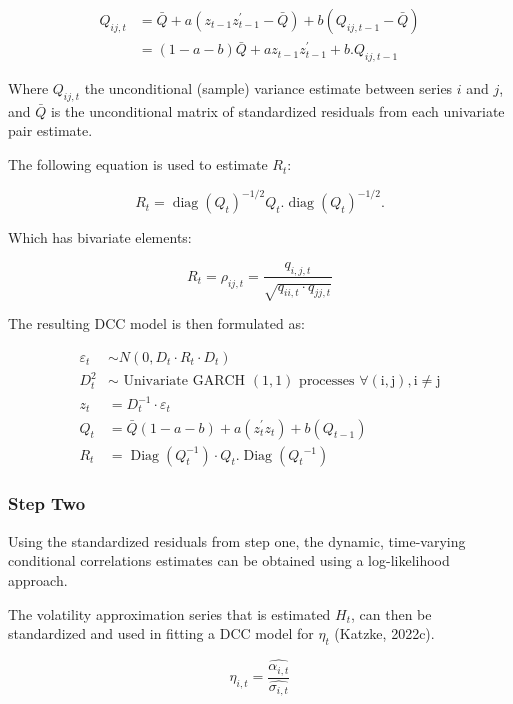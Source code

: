 \documentclass[11pt,preprint, authoryear]{elsarticle}
\numberwithin{equation}{section}
\numberwithin{figure}{section}
\numberwithin{table}{section}
\begin{document}
\[
\begin{aligned}
Q_{i j, t} & =\bar{Q}+a\left(z_{t-1} z_{t-1}^{\prime}-\bar{Q}\right)+b\left(Q_{i j, t-1}-\bar{Q}\right) \\
& =(1-a-b) \bar{Q}+a z_{t-1} z_{t-1}^{\prime}+b . Q_{i j, t-1}
\end{aligned}
\]

Where \(Q_{i j, t}\) the unconditional (sample) variance estimate
between series \(i\) and \(j\), and \(\bar{Q}\) is the unconditional
matrix of standardized residuals from each univariate pair estimate.

The following equation is used to estimate \(R_{t}\):

\[
R_{t}=\operatorname{diag}\left(Q_{t}\right)^{-1 / 2} Q_{t} . \operatorname{diag}\left(Q_{t}\right)^{-1 / 2} .
\]

Which has bivariate elements:

\[
R_{t}=\rho_{i j, t}=\frac{q_{i, j, t}}{\sqrt{q_{i i, t} \cdot q_{j j, t}}}
\]

The resulting DCC model is then formulated as:

\[
\begin{aligned}
\varepsilon_{t} & \sim N\left(0, D_{t} \cdot R_{t} \cdot D_{t}\right) \\
D_{t}^{2} & \sim \text { Univariate GARCH }(1,1) \text { processes } \forall(\mathrm{i}, \mathrm{j}), \mathrm{i} \neq \mathrm{j} \\
z_{t} & =D_{t}^{-1} \cdot \varepsilon_{t} \\
Q_{t} & =\bar{Q}(1-a-b)+a\left(z_{t}^{\prime} z_{t}\right)+b\left(Q_{t-1}\right) \\
R_{t} & =\operatorname{Diag}\left(Q_{t}^{-1}\right) \cdot Q_{t} . \operatorname{Diag}\left(Q_{t}{ }^{-1}\right)
\end{aligned}
\]

\hypertarget{step-two}{%
\subsubsection{Step Two}\label{step-two}}

Using the standardized residuals from step one, the dynamic,
time-varying conditional correlations estimates can be obtained using a
log-likelihood approach.

The volatility approximation series that is estimated \(H_{t}\), can
then be standardized and used in fitting a DCC model for \(\eta_{t}\)
(Katzke, 2022c).

\[
\eta_{i, t}=\frac{\hat{\alpha_{i, t}}}{\hat{\sigma_{i, t}}}
\]
\end{document}
